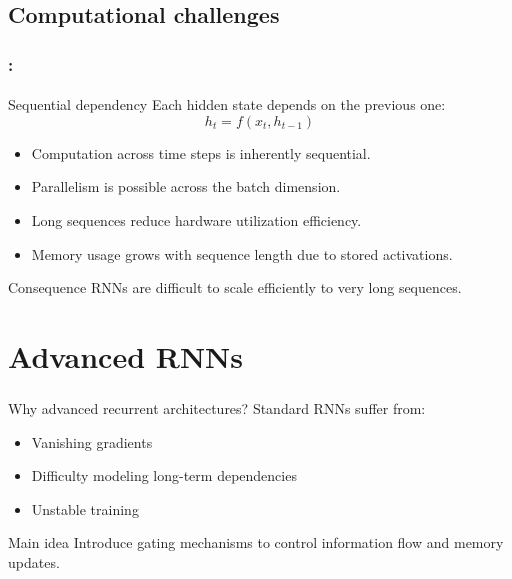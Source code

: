 \documentclass[xcolor=table]{beamer}
\begin{document}
\subsection{Computational challenges}

\begin{frame}
	\frametitle{\insertshortsubtitle: \insertsection}
	\framesubtitle{\insertsubsection}
	
	\begin{block}{Sequential dependency}
		Each hidden state depends on the previous one:
		\[
		h_t = f(x_t, h_{t-1})
		\]
	\end{block}
	
	\begin{itemize}
		\item Computation across time steps is inherently sequential.
		\item Parallelism is possible across the batch dimension.
		\item Long sequences reduce hardware utilization efficiency.
		\item Memory usage grows with sequence length due to stored activations.
	\end{itemize}
	
	\begin{alertblock}{Consequence}
		RNNs are difficult to scale efficiently to very long sequences.
	\end{alertblock}
	
\end{frame}


\section{Advanced RNNs}

\begin{frame}
	\frametitle{\insertshortsubtitle}
	\framesubtitle{\insertsection}
	
	\begin{alertblock}{Why advanced recurrent architectures?}
		Standard RNNs suffer from:
		\begin{itemize}
			\item Vanishing gradients
			\item Difficulty modeling long-term dependencies
			\item Unstable training
		\end{itemize}
	\end{alertblock}
	
	\vspace{0.4cm}
	
	\begin{block}{Main idea}
		Introduce gating mechanisms to control information flow and memory updates.
	\end{block}
	
\end{frame}
\end{document}
